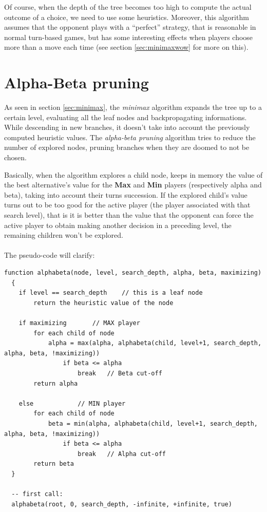 Of course, when the depth of the tree becomes too high to compute the actual outcome of a choice, we need to use some heuristics. Moreover, this algorithm assumes that the opponent plays with a ``perfect'' strategy, that is reasonable in normal turn-based games, but has some interesting effects when players choose more than a move each time (see section \ref{sec:minimaxwow} for more on this).

\section{Alpha-Beta pruning}
As seen in section \ref{sec:minimax}, the \textit{minimax} algorithm expands the tree up to a certain level, evaluating all the leaf nodes and backpropagating informations.
While descending in new branches, it doesn't take into account the previously computed heuristic values.
The \textit{alpha-beta pruning} algorithm tries to reduce the number of explored nodes, pruning branches when they are doomed to not be chosen.

Basically, when the algorithm explores a child node, keeps in memory the value of the best alternative's value for the \textbf{Max} and \textbf{Min} players (respectively alpha and beta), taking into account their turns succession.
If the explored child's value turns out to be too good for the active player (the player associated with that search level), that is it is better than the value that the opponent can force the active player to obtain making another decision in a preceding level, the remaining children won't be explored.\\
\\
The pseudo-code will clarify:\\
{\footnotesize
\lstset{language=C}
\begin{lstlisting}[frame=shadowbox,breaklines]
  function alphabeta(node, level, search_depth, alpha, beta, maximizing)
  {
    if level == search_depth	// this is a leaf node
    	return the heuristic value of the node
    
    if maximizing		// MAX player
    	for each child of node
        	alpha = max(alpha, alphabeta(child, level+1, search_depth, alpha, beta, !maximizing))
                if beta <= alpha
                	break	// Beta cut-off
        return alpha
        
    else			// MIN player
    	for each child of node
        	beta = min(alpha, alphabeta(child, level+1, search_depth, alpha, beta, !maximizing))
                if beta <= alpha
                	break	// Alpha cut-off
        return beta
  }
  
  -- first call:
  alphabeta(root, 0, search_depth, -infinite, +infinite, true)
\end{lstlisting}
}

